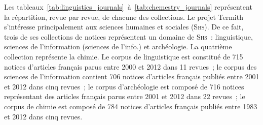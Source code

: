     \begin{table}
      \centering

      \caption{Détail des revues du corpus de chimie (Termith)
               \label{tab:chemestry_journals}}
    \end{table}
    Les tableaux~\ref{tab:linguistics_journals}~à~\ref{tab:chemestry_journals}
    représentent la répartition, revue par revue, de chacune des collections. Le
    projet Termith s'intéresse principalement aux sciences humaines et sociales
    (\textsc{Shs}). De ce fait, trois de ses collections de notices représentent
    un domaine de \textsc{Shs}~: linguistique, sciences de l'information
    (sciences de l'info.) et archéologie. La quatrième collection représente la
    chimie. Le corpus de linguistique est constitué de 715 notices d'articles
    français parus entre 2000 et 2012 dans 11 revues~; le corpus des sciences de
    l'information contient 706 notices d'articles français publiés entre 2001 et
    2012 dans cinq revues~; le corpus d'archéologie est composé de 716 notices
    représentant des articles français parus entre 2001 et 2012 dans 22 revues~;
    le corpus de chimie est composé de 784 notices d'articles français publiés
    entre 1983 et 2012 dans cinq revues.

